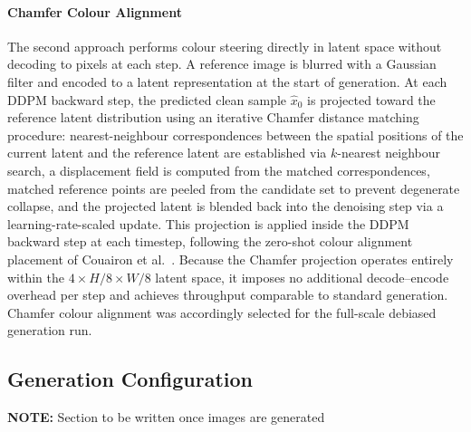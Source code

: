 \paragraph{Chamfer Colour Alignment}
The second approach performs colour steering directly in 
latent space without decoding to pixels at each step. A 
reference image is blurred with a Gaussian filter and 
encoded to a latent representation at the start of 
generation. At each DDPM backward step, the predicted 
clean sample $\hat{x}_0$ is projected toward the reference 
latent distribution using an iterative Chamfer distance 
matching procedure: nearest-neighbour correspondences 
between the spatial positions of the current latent and 
the reference latent are established via $k$-nearest 
neighbour search, a displacement field is computed from 
the matched correspondences, matched reference points are 
peeled from the candidate set to prevent degenerate 
collapse, and the projected latent is blended back into 
the denoising step via a learning-rate-scaled update. 
This projection is applied inside the DDPM backward step 
at each timestep, following the zero-shot colour alignment 
placement of Couairon et 
al.\ \cite{Couairon_2022_ZeroShotImageToImage}. Because 
the Chamfer projection operates entirely within the 
$4 \times H/8 \times W/8$ latent space, it imposes no 
additional decode--encode overhead per step and achieves 
throughput comparable to standard generation. Chamfer 
colour alignment was accordingly selected for the 
full-scale debiased generation run.

\subsection{Generation Configuration}
\label{subsec:debias_config}

\textbf{NOTE:} Section to be written once images are generated

